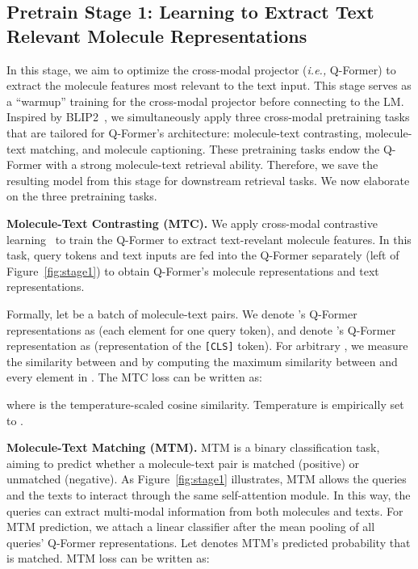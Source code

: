 \documentclass[11pt]{article}
\newcommand{\ie}{\emph{i.e., }}
\begin{document}
\subsection{Pretrain Stage 1: Learning to Extract Text Relevant Molecule Representations}
In this stage, we aim to optimize the cross-modal projector (\ie Q-Former) to extract the molecule features most relevant to the text input. This stage serves as a ``warmup'' training for the cross-modal projector before connecting to the LM. Inspired by BLIP2~\cite{BLIP2}, we simultaneously apply three cross-modal pretraining tasks that are tailored for Q-Former's architecture: molecule-text contrasting, molecule-text matching, and molecule captioning. These pretraining tasks endow the Q-Former with a strong molecule-text retrieval ability. Therefore, we save the resulting model from this stage for downstream retrieval tasks. We now elaborate on the three pretraining tasks. 



\textbf{Molecule-Text Contrasting (MTC).} We apply cross-modal contrastive learning~\citep{CLIP} to train the Q-Former to extract text-revelant molecule features. 
In this task, query tokens and text inputs are fed into the Q-Former separately (left of Figure~\ref{fig:stage1}) to obtain Q-Former's molecule representations and text representations.





Formally, let  be a batch of molecule-text pairs. We denote 's Q-Former representations as  (each element for one query token), and denote 's Q-Former representation as  (representation of the \texttt{[CLS]} token).
For arbitrary , we measure the similarity between  and  by computing the maximum similarity between  and every element in . The MTC loss  can be written as:

where  is the temperature-scaled cosine similarity. Temperature  is empirically set to .


\textbf{Molecule-Text Matching (MTM).} MTM is a binary classification task, aiming to predict whether a molecule-text pair is matched (positive) or unmatched (negative). As Figure~\ref{fig:stage1} illustrates, MTM allows the queries and the texts to interact through the same self-attention module. In this way, the queries can extract multi-modal information from both molecules and texts. For MTM prediction, we attach a linear classifier after the mean pooling of all queries' Q-Former representations. Let  denotes MTM's predicted probability that  is matched. MTM loss  can be written as:
\end{document}
